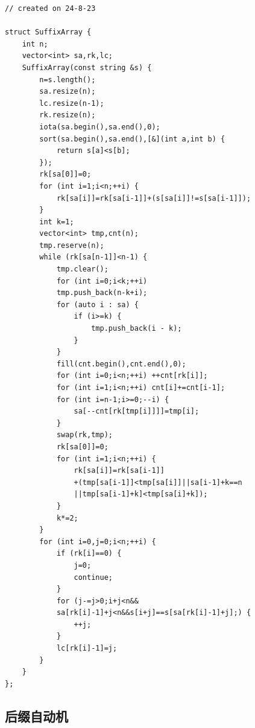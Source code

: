 \documentclass[a4paper,12pt]{article}
\begin{document}
\begin{lstlisting}
// created on 24-8-23

struct SuffixArray {
    int n;
    vector<int> sa,rk,lc;
    SuffixArray(const string &s) {
        n=s.length();
        sa.resize(n);
        lc.resize(n-1);
        rk.resize(n);
        iota(sa.begin(),sa.end(),0);
        sort(sa.begin(),sa.end(),[&](int a,int b) {
            return s[a]<s[b];
        });
        rk[sa[0]]=0;
        for (int i=1;i<n;++i) {
            rk[sa[i]]=rk[sa[i-1]]+(s[sa[i]]!=s[sa[i-1]]);
        }
        int k=1;
        vector<int> tmp,cnt(n);
        tmp.reserve(n);
        while (rk[sa[n-1]]<n-1) {
            tmp.clear();
            for (int i=0;i<k;++i)
            tmp.push_back(n-k+i);
            for (auto i : sa) {
                if (i>=k) {
                    tmp.push_back(i - k);
                }
            }
            fill(cnt.begin(),cnt.end(),0);
            for (int i=0;i<n;++i) ++cnt[rk[i]];
            for (int i=1;i<n;++i) cnt[i]+=cnt[i-1];
            for (int i=n-1;i>=0;--i) {
                sa[--cnt[rk[tmp[i]]]]=tmp[i];
            }
            swap(rk,tmp);
            rk[sa[0]]=0;
            for (int i=1;i<n;++i) {
                rk[sa[i]]=rk[sa[i-1]]
                +(tmp[sa[i-1]]<tmp[sa[i]]||sa[i-1]+k==n
                ||tmp[sa[i-1]+k]<tmp[sa[i]+k]);
            }
            k*=2;
        }
        for (int i=0,j=0;i<n;++i) {
            if (rk[i]==0) {
                j=0;
                continue;
            }
            for (j-=j>0;i+j<n&&
            sa[rk[i]-1]+j<n&&s[i+j]==s[sa[rk[i]-1]+j];) {
                ++j;
            }
            lc[rk[i]-1]=j;
        }
    }
};
\end{lstlisting}

\subsection{后缀自动机}
\end{document}
